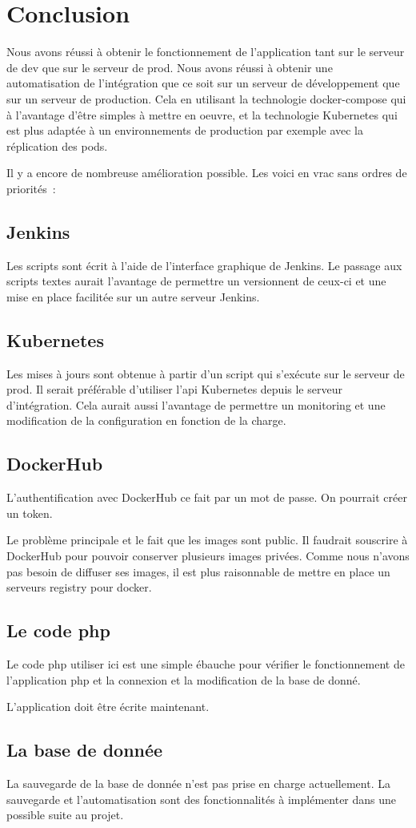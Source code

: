 ﻿\section{Conclusion}
Nous avons réussi à obtenir le fonctionnement de l'application tant sur le serveur de dev que sur le serveur de prod.
Nous avons réussi à obtenir une automatisation de l'intégration que ce soit sur un serveur de développement que sur un serveur de production.
Cela en utilisant la technologie docker-compose qui à l'avantage d'être simples à mettre en oeuvre,
et la technologie Kubernetes qui est plus adaptée à un environnements de production par exemple avec la réplication des pods.

Il y a encore de nombreuse amélioration possible.
Les voici en vrac sans ordres de priorités~:

\subsection{Jenkins}
Les scripts sont écrit à l'aide de l'interface graphique de Jenkins.
Le passage aux scripts textes aurait l'avantage de permettre un versionnent de ceux-ci et
une mise en place facilitée sur un autre serveur Jenkins.

\subsection{Kubernetes}
Les mises à jours sont obtenue à partir d'un script qui s'exécute sur le
serveur de prod.
Il serait préférable d'utiliser l'api Kubernetes depuis le serveur d’intégration.
Cela aurait aussi l'avantage de permettre un monitoring et une modification de la configuration en fonction de la charge.

\subsection{DockerHub}
L'authentification avec DockerHub ce fait par un mot de passe.
On pourrait créer un token.

Le problème principale et le fait que les images sont public.
Il faudrait souscrire à DockerHub pour pouvoir conserver plusieurs images privées.
Comme nous n'avons pas besoin de diffuser ses images,
il est plus raisonnable de mettre en place un serveurs registry pour docker.


\subsection{Le code php}
Le code php utiliser ici est une simple ébauche pour vérifier le fonctionnement de l'application php et la connexion et la modification de la base de donné.

L'application doit être écrite maintenant.

\subsection{La base de donnée}
La sauvegarde de la base de donnée n'est pas prise en charge actuellement.
La sauvegarde et l’automatisation sont des fonctionnalités à implémenter dans une possible suite au projet.
